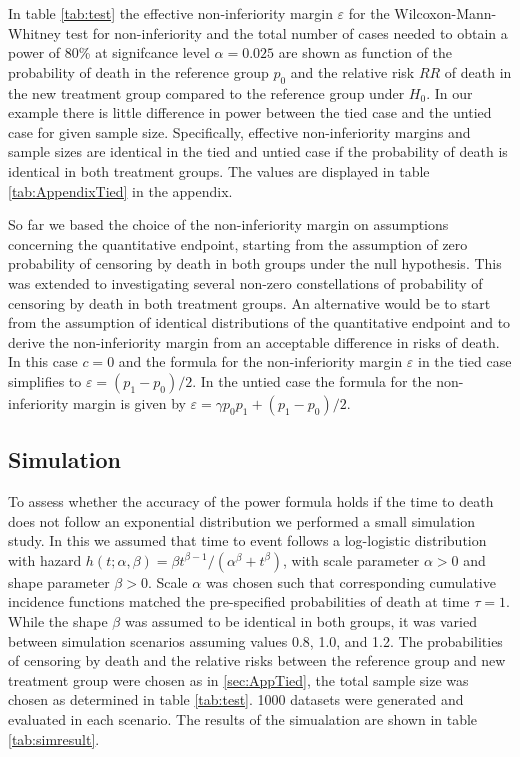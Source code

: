 \documentclass[bimj,fleqn]{w-art}
\theoremstyle{plain}
\theoremstyle{definition}
\begin{document}
In table \ref{tab:test} the effective non-inferiority margin $\varepsilon$ for the
Wilcoxon-Mann-Whitney test for non-inferiority and the total number of cases
needed to obtain a power of 80\% at signifcance level $\alpha =0.025$ are
shown as function of the probability of death in the reference group $p_0$ and
the relative risk $RR$ of death in the new treatment group compared to the
reference group under $H_0$.
In our example there is little difference in power between the tied case
and the untied case for given sample size. Specifically, effective
non-inferiority margins and sample sizes are identical in the tied and untied
case if the probability of death is identical in both treatment groups. The
values are  displayed in table \ref{tab:AppendixTied} in the appendix.

So far we based the choice of the non-inferiority margin on assumptions
concerning the quantitative endpoint, starting from the assumption of zero
probability of censoring by death in both groups under the null hypothesis.
This was extended to investigating several non-zero constellations of probability
of censoring by death in both treatment groups. An alternative would be to start
from the assumption of identical distributions of the quantitative endpoint and
to derive the non-inferiority margin from an acceptable difference in risks of
death. In this case $c = 0$ and the formula for the non-inferiority margin
$\varepsilon$ in the tied case simplifies to $\varepsilon = (p_1 - p_0) / 2$.
In the untied case the formula for the non-inferiority margin is given by
$\varepsilon = \gamma p_0 p_1 + (p_1 - p_0) / 2$.


\subsection{Simulation}
\label{sec:Sim}

To assess whether the accuracy of the power formula holds if the time to
death does not follow an exponential distribution we performed a small simulation
study. In this we assumed that time to event follows a log-logistic distribution
with hazard $h(t; \alpha, \beta) = \beta t^{\beta - 1} / (\alpha^{\beta} + t^{\beta})$,
with scale parameter $\alpha > 0 $ and shape parameter $\beta > 0$. Scale $\alpha$ was
chosen such that corresponding cumulative incidence functions matched the
pre-specified probabilities of death at time $\tau = 1$. While the shape $\beta$
was assumed to be identical in both groups, it was varied between simulation
scenarios assuming values 0.8, 1.0, and 1.2.
The probabilities of censoring by death and the relative risks between the
reference group and new treatment group were chosen as in \ref{sec:AppTied}, the
total sample size was chosen as determined in table \ref{tab:test}. 1000 datasets
were generated and evaluated in each scenario. The results of the simualation
are shown in table \ref{tab:simresult}.
\end{document}

